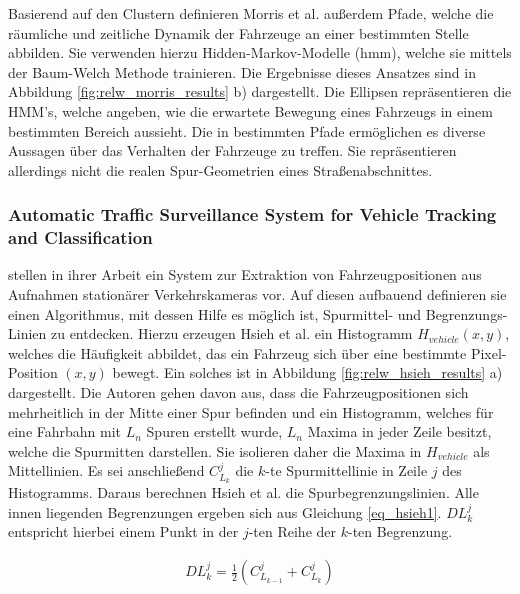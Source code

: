 Basierend auf den Clustern definieren Morris et al. außerdem Pfade, welche die räumliche und zeitliche Dynamik
der Fahrzeuge an einer bestimmten Stelle abbilden. Sie verwenden hierzu Hidden-Markov-Modelle (\acrshort*{hmm}),
welche sie mittels der Baum-Welch Methode trainieren.
Die Ergebnisse dieses Ansatzes sind in Abbildung \ref{fig:relw_morris_results} b) dargestellt. Die
Ellipsen repräsentieren die HMM's, welche angeben, wie die erwartete Bewegung eines Fahrzeugs in einem
bestimmten Bereich aussieht.
Die in \cite[]{Morris2011} bestimmten Pfade ermöglichen es diverse Aussagen über das Verhalten der Fahrzeuge
zu treffen. Sie repräsentieren allerdings nicht die realen Spur-Geometrien eines Straßenabschnittes.    
 
\subsubsection*{Automatic Traffic Surveillance System for Vehicle Tracking and Classification}

\cite[]{Hsieh2006} stellen in ihrer Arbeit ein System zur Extraktion von Fahrzeugpositionen aus Aufnahmen
stationärer Verkehrskameras vor. Auf diesen aufbauend definieren sie einen Algorithmus, mit dessen Hilfe es
möglich ist, Spurmittel- und Begrenzungs-Linien zu entdecken.
Hierzu erzeugen Hsieh et al. ein Histogramm $H_{vehicle}(x,y)$, welches die Häufigkeit abbildet, das ein Fahrzeug sich über eine
bestimmte Pixel-Position $(x, y)$ bewegt. Ein solches ist in Abbildung \ref{fig:relw_hsieh_results} a) dargestellt.
Die Autoren gehen davon aus, dass die Fahrzeugpositionen sich mehrheitlich in der Mitte einer Spur befinden und
ein Histogramm, welches für eine Fahrbahn mit $L_n$ Spuren erstellt wurde, $L_n$ Maxima in jeder Zeile besitzt,
welche die Spurmitten darstellen.
Sie isolieren daher die Maxima in $H_{vehicle}$ als Mittellinien. Es sei anschließend $C_{L_k}^{j}$ die $k$-te Spurmittellinie
in Zeile $j$ des Histogramms. Daraus berechnen Hsieh et al. die Spurbegrenzungslinien. Alle innen liegenden
Begrenzungen ergeben sich aus Gleichung \ref{eq_hsieh1}. $DL_{k}^{j}$ entspricht hierbei einem Punkt
in der $j$-ten Reihe der $k$-ten Begrenzung.

\begin{ceqn}
\begin{align}
\label{eq_hsieh1}
    DL_{k}^{j} = \frac{1}{2} (C_{L_{k-1}}^{j} + C_{L_{k}}^{j})
\end{align}
\end{ceqn}

